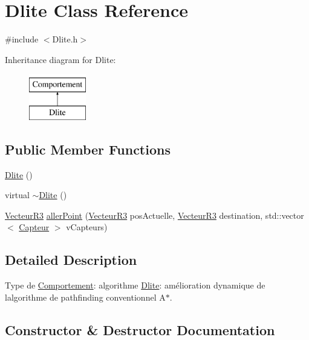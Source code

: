 \hypertarget{class_dlite}{}\section{Dlite Class Reference}
\label{class_dlite}


{\ttfamily \#include $<$Dlite.\+h$>$}

Inheritance diagram for Dlite\+:\begin{figure}[H]
\begin{center}
\leavevmode
\includegraphics[height=2.000000cm]{class_dlite}
\end{center}
\end{figure}
\subsection*{Public Member Functions}
\begin{DoxyCompactItemize}
\item 
\mbox{\hyperlink{class_dlite_a5f34443536a222e38f043d8370ca7b90}{Dlite}} ()
\item 
virtual \mbox{\hyperlink{class_dlite_ab98746140c7aa4ded45a47459b4c47d5}{$\sim$\+Dlite}} ()
\item 
\mbox{\hyperlink{class_vecteur_r3}{Vecteur\+R3}} \mbox{\hyperlink{class_dlite_a78c005fea65d3ae2429f74fd1d63c581}{aller\+Point}} (\mbox{\hyperlink{class_vecteur_r3}{Vecteur\+R3}} pos\+Actuelle, \mbox{\hyperlink{class_vecteur_r3}{Vecteur\+R3}} destination, std\+::vector$<$ \mbox{\hyperlink{class_capteur}{Capteur}} $>$ v\+Capteurs)
\end{DoxyCompactItemize}


\subsection{Detailed Description}
Type de \mbox{\hyperlink{class_comportement}{Comportement}}\+: algorithme \mbox{\hyperlink{class_dlite}{Dlite}}\+: amélioration dynamique de l\textquotesingle{}algorithme de pathfinding conventionnel A$\ast$. 

\subsection{Constructor \& Destructor Documentation}
\mbox{\label{class_dlite_a5f34443536a222e38f043d8370ca7b90}} 
